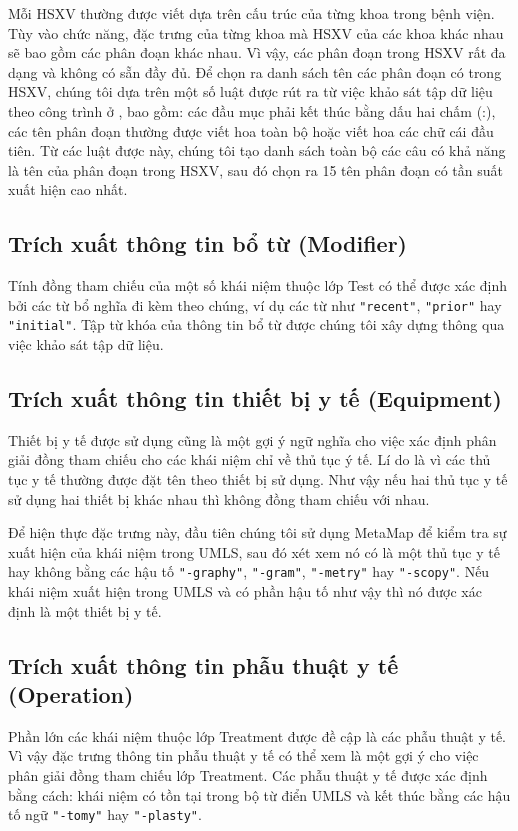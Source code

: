 Mỗi HSXV thường được viết dựa trên cấu trúc của từng khoa trong bệnh viện. Tùy vào chức năng, đặc trưng của từng khoa mà HSXV của các khoa khác nhau sẽ bao gồm các phân đoạn khác nhau. Vì vậy, các phân đoạn trong HSXV rất đa dạng và không có sẵn đầy đủ. Để chọn ra danh sách tên các phân đoạn có trong HSXV, chúng tôi dựa trên một số luật được rút ra từ việc khảo sát tập dữ liệu theo công trình ở \cite{RandolphMiller2008}, bao gồm: các đầu mục phải kết thúc bằng dấu hai chấm (:), các tên phân đoạn thường được viết hoa toàn bộ hoặc viết hoa các chữ cái đầu tiên. Từ các luật được này, chúng tôi tạo danh sách toàn bộ các câu có khả năng là tên của phân đoạn trong HSXV, sau đó chọn ra 15 tên phân đoạn có tần suất xuất hiện cao nhất.

\subsection*{Trích xuất thông tin bổ từ (Modifier)}
Tính đồng tham chiếu của một số khái niệm thuộc lớp Test có thể được xác định bởi các từ bổ nghĩa đi kèm theo chúng, ví dụ các từ như \texttt{"recent"}, \texttt{"prior"} hay \texttt{"initial"}. Tập từ khóa của thông tin bổ từ được chúng tôi xây dựng thông qua việc khảo sát tập dữ liệu.

\subsection*{Trích xuất thông tin thiết bị y tế (Equipment)}
Thiết bị y tế được sử dụng cũng là một gợi ý ngữ nghĩa cho việc xác định phân giải đồng tham chiếu cho các khái niệm chỉ về thủ tục ý tế. Lí do là vì các thủ tục y tế thường được đặt tên theo thiết bị sử dụng. Như vậy nếu hai thủ tục y tế sử dụng hai thiết bị khác nhau thì không đồng tham chiếu với nhau. 

Để hiện thực đặc trưng này, đầu tiên chúng tôi sử dụng MetaMap để kiểm tra sự xuất hiện của khái niệm trong UMLS, sau đó xét xem nó có là một thủ tục y tế hay không bằng các hậu tố \texttt{"-graphy"}, \texttt{"-gram"}, \texttt{"-metry"} hay \texttt{"-scopy"}. Nếu khái niệm xuất hiện trong UMLS và có phần hậu tố như vậy thì nó được xác định là một thiết bị y tế.

\subsection*{Trích xuất thông tin phẫu thuật y tế (Operation)}
Phần lớn các khái niệm thuộc lớp Treatment được đề cập là các phẫu thuật y tế. Vì vậy đặc trưng thông tin phẫu thuật y tế có thể xem là một gợi ý cho việc phân giải đồng tham chiếu lớp Treatment. Các phẫu thuật y tế được xác định bằng cách: khái niệm có tồn tại trong bộ từ điển UMLS và kết thúc bằng các hậu tố ngữ \texttt{"-tomy"} hay \texttt{"-plasty"}.

